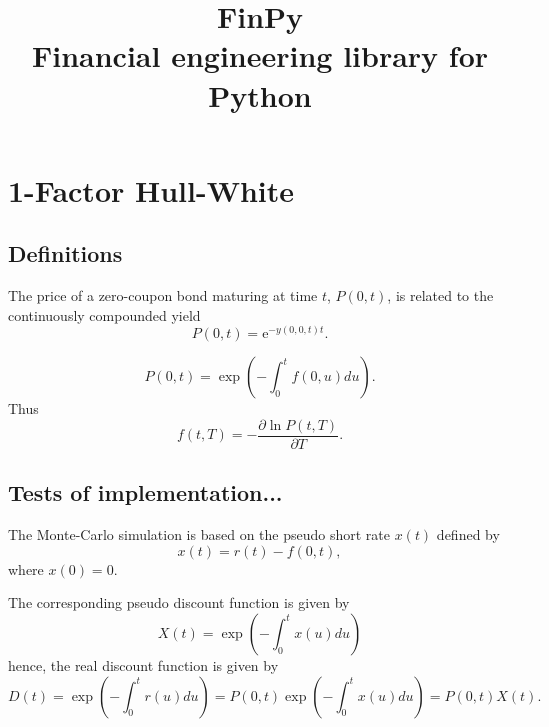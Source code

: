 \documentclass{report}
\title{FinPy \\[0.4cm] \Large Financial engineering library for Python}
\newcommand{\e}{\text{e}}
\begin{document}
\maketitle

\tableofcontents



\chapter{1-Factor Hull-White}

\section{Definitions}

The price of a zero-coupon bond maturing at time $t$, $P(0,t)$, is related to the continuously compounded yield
\begin{equation}
P(0,t) = \e^{-y(0,0,t) t}.
\end{equation}

\begin{equation}
P(0,t) = \exp \left( -\int_0^t f(0,u) du \right).
\end{equation}
Thus
\begin{equation}
f(t,T) = - \frac{\partial \ln P(t,T)}{\partial T}.
\end{equation}


\section{Tests of implementation...}

The Monte-Carlo simulation is based on the pseudo short rate $x(t)$ defined by
\begin{equation}
x(t) = r(t) - f(0,t),
\end{equation}
where $x(0) = 0$.

The corresponding pseudo discount function is given by
\begin{equation}
X(t) = \exp \left( - \int_0^t x(u) du \right)
\end{equation}
hence, the real discount function is given by
\begin{equation}
D(t) = \exp \left( - \int_0^t r(u) du \right) = P(0,t) \exp \left( - \int_0^t x(u) du \right) = P(0,t) X(t).
\end{equation}
\end{document}
